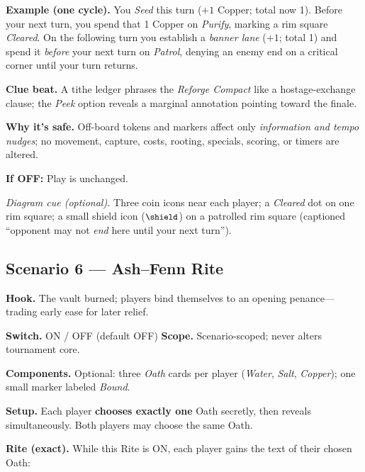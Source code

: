 \documentclass[11pt]{article}
\begin{document}
\medskip
\noindent\textbf{Example (one cycle).}  
You \emph{Seed} this turn (\(+1\) Copper; total now 1). Before your next turn, you spend that 1 Copper on \emph{Purify}, marking a rim square \emph{Cleared}. On the following turn you establish a \emph{banner lane} (\(+1\); total 1) and spend it \emph{before} your next turn on \emph{Patrol}, denying an enemy end on a critical corner until your turn returns.

\medskip
\noindent\textbf{Clue beat.} A tithe ledger phrases the \emph{Reforge Compact} like a hostage-exchange clause; the \emph{Peek} option reveals a marginal annotation pointing toward the finale.

\medskip
\noindent\textbf{Why it’s safe.} Off-board tokens and markers affect only \emph{information and tempo nudges}; no movement, capture, costs, rooting, specials, scoring, or timers are altered.

\medskip
\noindent\textbf{If \textsc{OFF}:} Play is unchanged.

\medskip
\noindent\textit{Diagram cue (optional).} Three coin icons near each player; a \emph{Cleared} dot on one rim square; a small shield icon (\(\small\shield\)) on a patrolled rim square (captioned “opponent may not \emph{end} here until your next turn”).

\subsection{Scenario 6 — Ash–Fenn Rite}
\label{scen:ash-fenn-rite}

\noindent\textbf{Hook.} The vault burned; players bind themselves to an opening penance—trading early ease for later relief.

\medskip
\noindent\textbf{Switch.} \textsc{ON / OFF} (default \textsc{OFF}) \hfill \textbf{Scope.} Scenario-scoped; never alters tournament core.

\medskip
\noindent\textbf{Components.} Optional: three \emph{Oath} cards per player (\textit{Water}, \textit{Salt}, \textit{Copper}); one small marker labeled \emph{Bound}.

\medskip
\noindent\textbf{Setup.} Each player \textbf{chooses exactly one} Oath secretly, then reveals simultaneously. Both players may choose the same Oath.

\medskip
\noindent\textbf{Rite (exact).} While this Rite is \textsc{ON}, each player gains the text of their chosen Oath:
\end{document}
